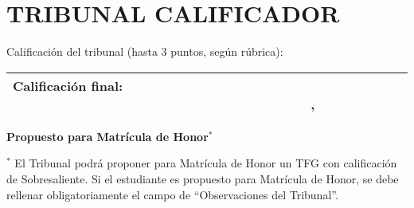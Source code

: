 \documentclass[11pt,a4paper,oneside]{article}
\begin{document}
\begin{description}
  \item[\expandafter\makefirstuc\expandafter{\wordTutorOrTutora}:] \myAcademicTutorFullName
        \ifthenelse{\equal{\myCoTutorFullName}{}}
        {
        }
        {
  \item[\expandafter\makefirstuc\expandafter{\wordCoTutorOrCoTutora}:] \myCoTutorFullName
        }
  \item[Departmento:] \myDepartment

        \ifthenelse{\equal{\myCoTutorFullName}{}}
        {
  \item[Calificación \wordTutorDelOrDeLa{} \wordTutorOrTutora:] \myAcademicTutorGrade
      }
        {
  \item[Calificación \wordTutorDelOrDeLa{} \wordTutorOrTutora{} y \wordCoTutorDelOrDeLa{} \wordCoTutorOrCoTutora:] \myAcademicTutorGrade
          }
\end{description}


\section*{TRIBUNAL CALIFICADOR}

\begin{description}
  \item[Calificación del tribunal (hasta 3 puntos, según rúbrica):] \myTribunalGrade{}
\end{description}


\begin{table}[ht]
  \centering
  \begin{tabularx}{\textwidth}{|X|}
    \hline
    \vspace{-1mm}
    \textbf{Calificación final:}\newline
    \indent ~~~~~~~~~~~~~~~~~~~~~~~~~~~~~~~~~~~~~~~~   \myFinalGrade{}, \myFinalGradeName{}
    \vspace{1mm} \\ \hline
  \end{tabularx}
\end{table}

\noindent\textbf{Propuesto para Matrícula de Honor}$\mathbf{^{*}}$ ~~~~~~~~ \MHProposalBoxes{}

\noindent$^{*}$ El Tribunal podrá proponer para Matrícula de Honor un TFG con calificación de Sobresaliente. Si el estudiante es propuesto para Matrícula de Honor, se debe rellenar obligatoriamente el campo de ``Observaciones del Tribunal''.
\end{document}
